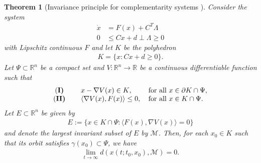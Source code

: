 \documentclass[journal]{IEEEtran}
\newcommand{\1}{\mathds 1}
\newcommand{\p}{\partial}
\newcommand{\n}{\nabla}
\newcommand{\real}{\mathbb{R}}
\newcommand{\map}[3]{#1:#2 \rightarrow #3}
\newtheorem{theorem}{Theorem}[section]
\theoremstyle{remark}
\theoremstyle{definition}
\begin{document}
\begin{theorem}[Invariance principle for complementarity systems
  \cite{brogliato2005krakovskii}]
  \label{thm:inv-prin}
  Consider the system
\begin{subequations}\label{eq:compact-comp}
  \begin{align}
    \dot x&= F(x)+C^T\Lambda\\
    0&\leq Cx+d\perp \Lambda\geq0
  \end{align}
\end{subequations}
  with  Lipschitz continuous $F$ and let $K$ be the polyhedron 
\begin{align}\label{eq:K}
  K=\{x : Cx+d\geq 0\}.
\end{align}
Let $\Psi\subset\real^n$ be a compact set and $\map{V}{\real^n}{\real}$ be a continuous differentiable function such that 
\begin{align*}
\begin{tabular}[h]{cll}
\textup{(\bf I)}&\quad $x-\n V(x)\in K$, &for all $x\in\p K\cap \Psi$,\\
\textup{(\bf II)}&\quad $\langle \n V(x),F(x)\rangle\leq0$, &for all $x\in K\cap \Psi$.
\end{tabular}
\end{align*}
Let $E\subset \mathbb R^n$ be given by
\begin{align*}
  E:=\{x\in K\cap \Psi : \langle F(x),\n V(x)\rangle=0\}
\end{align*}
and denote the largest invariant subset of $E$ by $\mathcal M$. Then, for each $x_0\in K$ such that its orbit satisfies $\gamma(x_0)\subset \Psi$, we have 
\begin{align*}
  \lim_{t\to\infty}d(x(t;t_0,x_0),\mathcal M)=0.
\end{align*}
\end{theorem}
%









\end{document}
